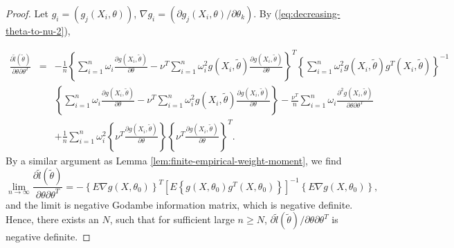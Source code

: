 \begin{proof}
Let $g_{i}=\left(g_{j}\left(X_{i},\theta\right)\right)$, $\nabla g_{i}=\left({\partial g_{j}\left(X_{i},\theta\right)} / {\partial\theta_{k}}\right)$. By (\ref{eq:decreasing-theta-to-nu-2}), 

\begin{eqnarray*}
\frac{\partial\tilde{l}\left(\tilde{\theta}\right)}{\partial\theta\partial\theta^{T}}&=&-\frac{1}{n}\left\{ \sum_{i=1}^{n}\omega_{i}\frac{\partial g\left(X_{i},\tilde{\theta}\right)}{\partial\theta}-\nu^{T}\sum_{i=1}^{n}\omega_{i}^{2}g\left(X_{i},\tilde{\theta}\right)\frac{\partial g\left(X_{i},\tilde{\theta}\right)}{\partial\theta}\right\} ^{T}\left\{ \sum_{i=1}^{n}\omega_{i}^{2}g\left(X_{i},\tilde{\theta}\right)g^{T}\left(X_{i},\tilde{\theta}\right)\right\}^{-1} \\&&\left\{ \sum_{i=1}^{n}\omega_{i}\frac{\partial g\left(X_{i},\tilde{\theta}\right)}{\partial\theta}-\nu^{T}\sum_{i=1}^{n}\omega_{i}^{2}g\left(X_{i},\tilde{\theta}\right)\frac{\partial g\left(X_{i},\tilde{\theta}\right)}{\partial\theta}\right\} -\frac{\nu^{T}}{n}\sum_{i=1}^{n}\omega_{i}\frac{\partial^{2}g\left(X_{i},\tilde{\theta}\right)}{\partial\theta\partial\theta^{T}}\\&&+\frac{1}{n}\sum_{i=1}^{n}\omega_{i}^{2}\left\{ \nu^{T}\frac{\partial g\left(X_{i},\tilde{\theta}\right)}{\partial\theta}\right\} \left\{ \nu^{T}\frac{\partial g\left(X_{i},\tilde{\theta}\right)}{\partial\theta}\right\} ^{T}.
\end{eqnarray*}
By a similar argument as Lemma \ref{lem:finite-empirical-weight-moment}, we find 
\[
   \lim_{n\rightarrow\infty} \frac{\partial\tilde{l}\left(\tilde{\theta}\right)}{\partial\theta\partial\theta^{T}} = -\left\{E\nabla g (X,\theta_0) \right\}^T \left[E\left\{g (X,\theta_0)g^T (X,\theta_0)\right\}\right]^{-1} \left\{E\nabla g (X,\theta_0)\right\},
\]
and the limit is negative Godambe information matrix, which is negative definite. Hence, there exists an $N$, such that for sufficient large $n\ge N$, ${\partial\tilde{l}\left(\tilde{\theta}\right)} / {\partial\theta\partial\theta^{T}}$ is negative definite.


\end{proof}
